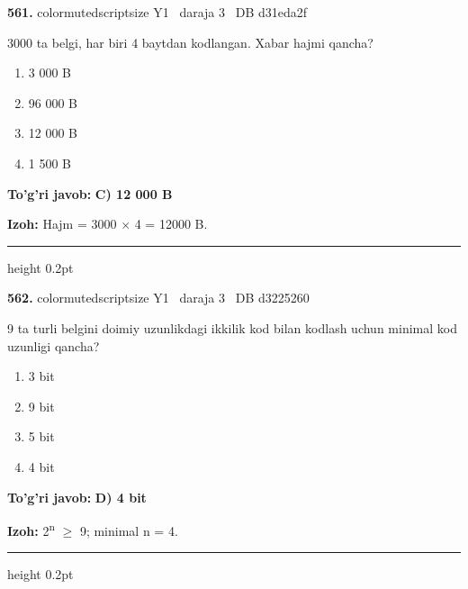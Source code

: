 \documentclass[10pt,a4paper,oneside]{article}
\begin{document}
\noindent\textbf{\color{ink}561.}  {color{muted}scriptsize Y1 \textbullet\ daraja 3 \textbullet\ DB d31eda2f}
\par
3000 ta belgi, har biri 4 baytdan kodlangan. Xabar hajmi qancha?
\begin{enumerate}[label=\Alph*),leftmargin=9mm]
\item 3 000 B
\item 96 000 B
\item 12 000 B
\item 1 500 B
\end{enumerate}
\begin{tcolorbox}[enhanced,breakable,colback=teal!4,colframe=teal!50!black,boxrule=0.5pt,arc=1.1mm,left=3mm,right=3mm,top=1.7mm,bottom=1.7mm,before skip=2mm,after skip=2mm]
\textbf{\color{teal}To'g'ri javob:} \textbf{C) 12 000 B}
\par\smallskip
\textbf{Izoh:} Hajm = 3000 \ensuremath{\times} 4 = 12000 B.
\end{tcolorbox}
\vspace{2mm}\hrule height 0.2pt \vspace{3mm}

\noindent\textbf{\color{ink}562.}  {color{muted}scriptsize Y1 \textbullet\ daraja 3 \textbullet\ DB d3225260}
\par
9 ta turli belgini doimiy uzunlikdagi ikkilik kod bilan kodlash uchun minimal kod uzunligi qancha?
\begin{enumerate}[label=\Alph*),leftmargin=9mm]
\item 3 bit
\item 9 bit
\item 5 bit
\item 4 bit
\end{enumerate}
\begin{tcolorbox}[enhanced,breakable,colback=teal!4,colframe=teal!50!black,boxrule=0.5pt,arc=1.1mm,left=3mm,right=3mm,top=1.7mm,bottom=1.7mm,before skip=2mm,after skip=2mm]
\textbf{\color{teal}To'g'ri javob:} \textbf{D) 4 bit}
\par\smallskip
\textbf{Izoh:} 2\textsuperscript{n} \ensuremath{\geq} 9; minimal n = 4.
\end{tcolorbox}
\vspace{2mm}\hrule height 0.2pt \vspace{3mm}
\end{document}
